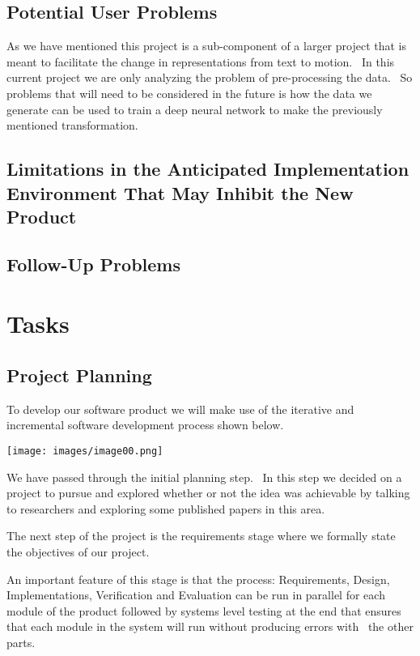 \documentclass{scrreprt}
\begin{document}
\subsection{Potential User Problems}

{As we have mentioned this project is a sub-component of a larger
project that is meant to facilitate the change in representations from
text to motion. ~In this current project we are only analyzing the
problem of pre-processing the data. ~So problems that will need to be
considered in the future is how the data we generate can be used to
train a deep neural network to make the previously mentioned
transformation.}

\subsection{Limitations in the Anticipated Implementation Environment That May
            Inhibit the New Product}

\subsection{Follow-Up Problems}

\section{Tasks}

\subsection{Project Planning}

{To develop our software product we will make use of the iterative and
incremental software development process shown below.}

{\texttt{[image: images/image00.png]}}

{We have passed through the initial planning step. ~In this step we
decided on a project to pursue and explored whether or not the idea was
achievable by talking to researchers and exploring some published papers
in this area.}

{The next step of the project is the requirements stage where we
formally state the objectives of our project. ~}

{An important feature of this stage is that the process: Requirements,
Design, Implementations, Verification and Evaluation can be run in
parallel for each module of the product followed by systems level
testing at the end that ensures that each module in the system will run
without producing errors with ~the other parts.}
\end{document}
